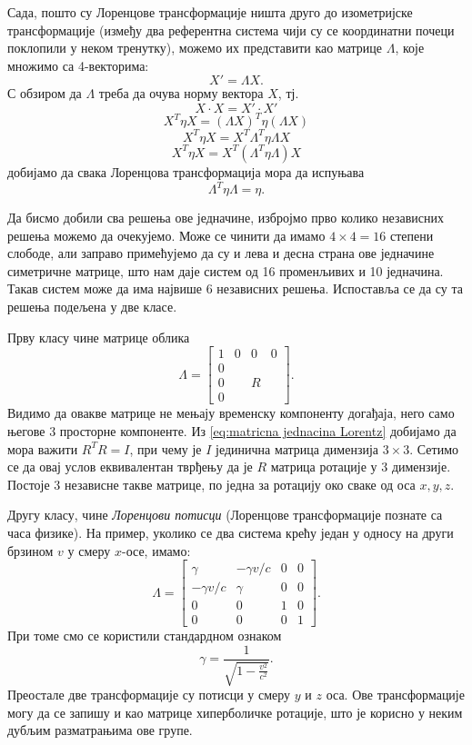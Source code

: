 \documentclass{report}
\theoremstyle{plain}
\theoremstyle{definition}
\begin{document}
Сада, пошто су Лоренцове трансформације ништа друго до изометријске трансформације (између два референтна система чији су се координатни почеци поклопили у неком тренутку), можемо их представити као матрице $\Lambda$, које множимо са 4-векторима:
$$X' = \Lambda X.$$
С обзиром да $\Lambda$ треба да очува норму вектора $X$, тј.
$$ X\cdot X = X'\cdot X'$$
$$X^T\eta X = (\Lambda X)^T\eta (\Lambda X)$$
$$X^T\eta X = X^T \Lambda^T\eta \Lambda X$$
$$X^T\eta X = X^T (\Lambda^T\eta \Lambda) X$$
добијамо да свака Лоренцова трансформација мора да испуњава
\label{dokaz za pseudoortogonalnu kvadratnu formu}
\begin{equation}
\label{eq:matricna jednacina Lorentz}
\Lambda^T \eta \Lambda = \eta. \tag{*}
\end{equation}

Да бисмо добили сва решења ове једначине, избројмо прво колико независних решења можемо да очекујемо. Може се чинити да имамо $4\times 4 = 16$ степени слободе, али заправо примећујемо да су и лева и десна страна ове једначине симетричне матрице, што нам даје систем од 16 променљивих и 10 једначина. Такав систем може да има највише 6 независних решења. Испоставља се да су та решења подељена у две класе.

Прву класу чине матрице облика
$$\Lambda = \begin{bmatrix}
    1 & 0 & 0 & 0 \\
    0 &   &   &   \\
    0 &   & R &   \\
    0 &   &   &
  \end{bmatrix}.$$
Видимо да овакве матрице не мењају временску компоненту догађаја, него само његове 3 просторне компоненте. Из \eqref{eq:matricna jednacina Lorentz} добијамо да мора важити $R^T R = I$, при чему је $I$ јединична матрица димензија $3\times 3$. Сетимо се да овај услов еквивалентан тврђењу да је $R$ матрица ротације у 3 димензије. Постоје 3 независне такве матрице, по једна за ротацију око сваке од оса $x, y, z$.

Другу класу, чине \emph{Лоренцови потисци} (Лоренцове трансформације познате са часа физике). На пример, уколико се два система крећу један у односу на други брзином $v$ у смеру $x$-осе, имамо:
$$\Lambda = \begin{bmatrix}
    \gamma & -\gamma v/c & 0 & 0 \\
    -\gamma v/c & \gamma & 0 & 0 \\
    0 &  0 & 1 & 0  \\
    0 & 0  & 0 & 1
  \end{bmatrix}.$$
При томе смо се користили стандардном ознаком
$$\gamma = \frac{1}{\sqrt{1-\frac{v^2}{c^2}}}.$$
Преостале две трансформације су потисци у смеру $y$ и $z$ оса. Ове трансформације могу да се запишу и као матрице хиперболичке ротације, што је корисно у неким дубљим разматрањима ове групе.
\end{document}
